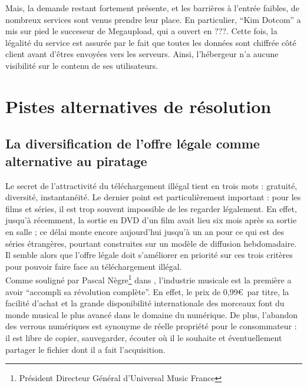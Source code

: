 \documentclass[a4paper]{report}
\begin{document}
	Mais, la demande restant fortement présente, et les barrières à l'entrée faibles, de nombreux services sont venus prendre leur place. En particulier, ``Kim Dotcom'' a mis sur pied le succeseur de Megaupload, qui a ouvert en ???. Cette fois, la légalité du service est assurée par le fait que toutes les données sont chiffrée côté client avant d'êtres envoyées vers les serveurs. Ainsi, l'hébergeur n'a aucune visibilité sur le contenu de ses utilisateurs.






	\chapter{Pistes alternatives de résolution}

	\section{La diversification de l'offre légale comme alternative au piratage}
	Le secret de l'attractivité du téléchargement illégal tient en trois mots : gratuité, diversité, instantanéité. Le dernier point est particulièrement important : pour les films et séries, il est trop souvent impossible de les regarder légalement. En effet, jusqu'à récemment, la sortie en DVD d'un film avait lieu six mois après sa sortie en salle ; ce délai monte encore aujourd'hui jusqu'à un an pour ce qui est des séries étrangères, pourtant construites sur un modèle de diffusion hebdomadaire. Il semble alors que l'offre légale doit s'améliorer en priorité sur ces trois critères pour pouvoir faire face au téléchargement illégal.\\

	Comme souligné par Pascal Nègre\footnote{Président Directeur Général d'Universal Music France} dans \cite{podcast-industrie-musicale}, l'industrie musicale est la première a avoir ``accompli sa révolution complète''. En effet, le prix de 0,99\euro\ par titre, la facilité d'achat et la grande disponibilité internationale des morceaux font du monde musical le plus avancé dans le domaine du numérique. De plus, l'abandon des verrous numériques est synonyme de réelle propriété pour le consommateur : il est libre de copier, sauvegarder, écouter où il le souhaite et éventuellement partager le fichier dont il a fait l'acquisition.\\
\end{document}
